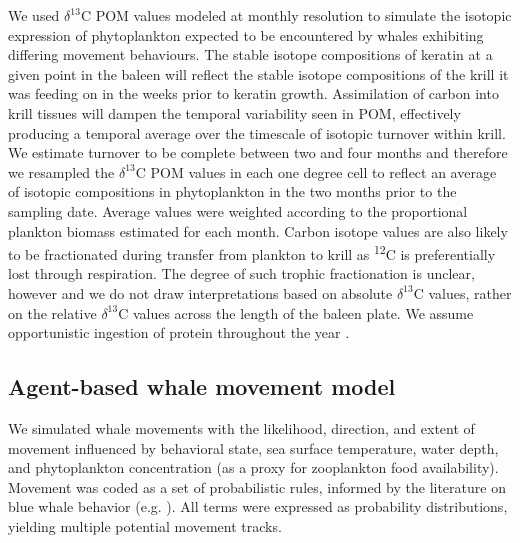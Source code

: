 \documentclass[a4paper,12pt]{article}
\begin{document}
We used \(\delta^{13}\)C POM values modeled at monthly resolution to simulate the isotopic expression of phytoplankton expected to be encountered by whales exhibiting differing movement behaviours. 
The stable isotope compositions of keratin at a given point in the baleen will reflect the stable isotope compositions of the krill it was feeding on in the weeks prior to keratin growth. 
Assimilation of carbon into krill tissues will dampen the temporal variability seen in POM, effectively producing a temporal average over the timescale of isotopic turnover within krill. 
We estimate turnover to be complete between two and four months and therefore we resampled the \(\delta^{13}\)C POM values in each one degree cell to reflect an average of isotopic compositions in phytoplankton in the two months prior to the sampling date. 
Average values were weighted according to the proportional plankton biomass estimated for each month. 
Carbon isotope values are also likely to be fractionated during transfer from plankton to krill as \textsuperscript{12}C is preferentially lost through respiration. 
The degree of such trophic fractionation is unclear, however and we do not draw interpretations based on absolute \(\delta^{13}\)C values, rather on the relative \(\delta^{13}\)C values across the length of the baleen plate. 
We assume opportunistic ingestion of protein throughout the year \cite{baines2017autumn,silva2013north,visser2011timing,busquets2017estimating, lesage2017foraging, bailey2009behavioural, branch2007, huckgaete2018}.

\subsection{Agent-based whale movement
model}\label{agent-based-whale-movement-model}

We simulated whale movements with the likelihood, direction, and extent of movement influenced by behavioral state, sea surface temperature, water depth, and phytoplankton concentration (as a proxy for zooplankton food availability).
Movement was coded as a set of probabilistic rules, informed by the literature on blue whale behavior (e.g. \cite{handbook}).
All terms were expressed as probability distributions, yielding multiple potential movement tracks.
\end{document}
